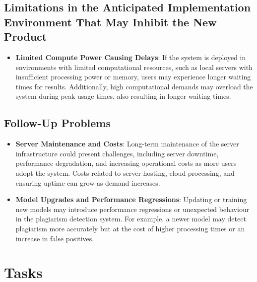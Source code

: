 \documentclass[12pt]{article}
\begin{document}
\subsection{Limitations in the Anticipated Implementation Environment That May Inhibit the New Product}
\begin{itemize}
    \item \textbf{Limited Compute Power Causing Delays}: If the system is deployed in environments with limited computational resources, such as local servers with insufficient processing power or memory, users may experience longer waiting times for results. Additionally, high computational demands may overload the system during peak usage times, also resulting in longer waiting times.
\end{itemize}

\subsection{Follow-Up Problems}
\begin{itemize}
    \item \textbf{Server Maintenance and Costs}: Long-term maintenance of the server infrastructure could present challenges, including server downtime, performance degradation, and increasing operational costs as more users adopt the system. Costs related to server hosting, cloud processing, and ensuring uptime can grow as demand increases.
    
    \item \textbf{Model Upgrades and Performance Regressions}: Updating or training new models may introduce performance regressions or unexpected behaviour in the plagiarism detection system. For example, a newer model may detect plagiarism more accurately but at the cost of higher processing times or an increase in false positives.
\end{itemize}



\section{Tasks}
\end{document}
